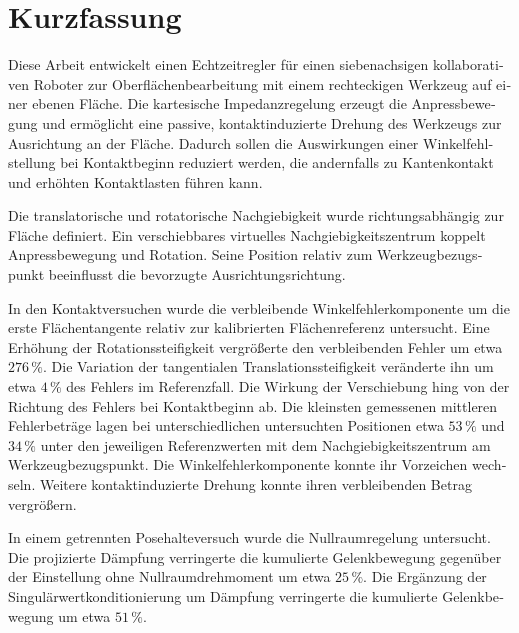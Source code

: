 \chapter*{Kurzfassung}

\begin{otherlanguage}{ngerman}

Diese Arbeit entwickelt einen Echtzeitregler für einen siebenachsigen
kollaborativen Roboter zur Oberflächenbearbeitung mit einem rechteckigen
Werkzeug auf einer ebenen Fläche. Die kartesische Impedanzregelung erzeugt die
Anpressbewegung und ermöglicht eine passive,
kontaktinduzierte Drehung des Werkzeugs zur Ausrichtung an der Fläche. Dadurch
sollen die Auswirkungen einer Winkelfehlstellung bei Kontaktbeginn reduziert
werden, die andernfalls zu Kantenkontakt und erhöhten Kontaktlasten führen
kann.

Die translatorische und rotatorische Nachgiebigkeit wurde richtungsabhängig zur
Fläche definiert. Ein verschiebbares virtuelles Nachgiebigkeitszentrum koppelt
Anpressbewegung und Rotation. Seine Position relativ zum Werkzeugbezugspunkt
beeinflusst die bevorzugte Ausrichtungsrichtung.

In den Kontaktversuchen wurde die verbleibende Winkelfehlerkomponente um die
erste Flächentangente relativ zur kalibrierten Flächenreferenz untersucht.
Eine Erhöhung der Rotationssteifigkeit
vergrößerte den verbleibenden Fehler um etwa \(276\,\%\).
Die Variation der tangentialen Translationssteifigkeit veränderte ihn um etwa
\(4\,\%\) des Fehlers im Referenzfall.
Die Wirkung der Verschiebung hing von der Richtung des Fehlers bei
Kontaktbeginn ab.
Die kleinsten gemessenen mittleren Fehlerbeträge lagen bei unterschiedlichen
untersuchten Positionen etwa \(53\,\%\) und \(34\,\%\) unter den jeweiligen
Referenzwerten mit dem Nachgiebigkeitszentrum am Werkzeugbezugspunkt.
Die Winkelfehlerkomponente konnte ihr Vorzeichen wechseln. Weitere
kontaktinduzierte Drehung konnte ihren verbleibenden Betrag vergrößern.

In einem getrennten Posehalteversuch wurde die Nullraumregelung untersucht.
Die projizierte Dämpfung verringerte die kumulierte Gelenkbewegung gegenüber
der Einstellung ohne Nullraumdrehmoment um etwa \(25\,\%\).
Die Ergänzung der Singulärwertkonditionierung um Dämpfung verringerte
die kumulierte Gelenkbewegung um etwa \(51\,\%\).

\end{otherlanguage}
